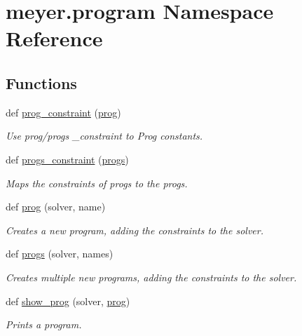 \hypertarget{namespacemeyer_1_1program}{}\section{meyer.\+program Namespace Reference}
\label{namespacemeyer_1_1program}
\subsection*{Functions}
\begin{DoxyCompactItemize}
\item 
def \hyperlink{namespacemeyer_1_1program_a2229fec0fdbcba6e277f26f537088c21}{prog\+\_\+constraint} (\hyperlink{namespacemeyer_1_1program_a2ec2977de2aefb152624161860abed00}{prog})
\begin{DoxyCompactList}\small\item\em Use prog/progs \+\_\+constraint to Prog constants. \end{DoxyCompactList}\item 
def \hyperlink{namespacemeyer_1_1program_aa1b9b5b66171bc75ca42d795003ada41}{progs\+\_\+constraint} (\hyperlink{namespacemeyer_1_1program_ae0fe8928ca6b44bea0484d83cb8b98dc}{progs})
\begin{DoxyCompactList}\small\item\em Maps the constraints of progs to the progs. \end{DoxyCompactList}\item 
def \hyperlink{namespacemeyer_1_1program_a2ec2977de2aefb152624161860abed00}{prog} (solver, name)
\begin{DoxyCompactList}\small\item\em Creates a new program, adding the constraints to the solver. \end{DoxyCompactList}\item 
def \hyperlink{namespacemeyer_1_1program_ae0fe8928ca6b44bea0484d83cb8b98dc}{progs} (solver, names)
\begin{DoxyCompactList}\small\item\em Creates multiple new programs, adding the constraints to the solver. \end{DoxyCompactList}\item 
def \hyperlink{namespacemeyer_1_1program_a98fde47f6e0b55f0a853504c52f42695}{show\+\_\+prog} (solver, \hyperlink{namespacemeyer_1_1program_a2ec2977de2aefb152624161860abed00}{prog})
\begin{DoxyCompactList}\small\item\em Prints a program. \end{DoxyCompactList}\item 

\end{DoxyCompactItemize}
